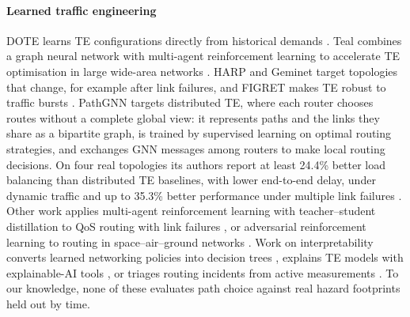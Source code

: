 \documentclass[preprint,12pt]{elsarticle}
\begin{document}
\paragraph{Learned traffic engineering}
DOTE learns TE configurations directly from historical demands \cite{dote23}. Teal combines a graph neural network with multi-agent reinforcement learning to accelerate TE optimisation in large wide-area networks \cite{teal23}. HARP \cite{harp24} and Geminet \cite{geminet26} target topologies that change, for example after link failures, and FIGRET makes TE robust to traffic bursts \cite{figret24}. PathGNN targets distributed TE, where each router chooses routes without a complete global view: it represents paths and the links they share as a bipartite graph, is trained by supervised learning on optimal routing strategies, and exchanges GNN messages among routers to make local routing decisions. On four real topologies its authors report at least 24.4\% better load balancing than distributed TE baselines, with lower end-to-end delay, under dynamic traffic and up to 35.3\% better performance under multiple link failures \cite{pathgnn25}. Other work applies multi-agent reinforcement learning with teacher--student distillation to QoS routing with link failures \cite{dts25}, or adversarial reinforcement learning to routing in space--air--ground networks \cite{rarl26}. Work on interpretability converts learned networking policies into decision trees \cite{metis20}, explains TE models with explainable-AI tools \cite{clearnet25}, or triages routing incidents from active measurements \cite{vasileva26}. To our knowledge, none of these evaluates path choice against real hazard footprints held out by time.
\end{document}
